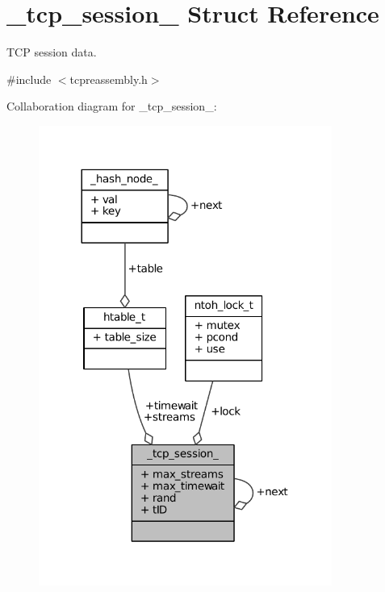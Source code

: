 \hypertarget{struct__tcp__session__}{\section{\-\_\-tcp\-\_\-session\-\_\- Struct Reference}
\label{struct__tcp__session__}
}


T\-C\-P session data.  




{\ttfamily \#include $<$tcpreassembly.\-h$>$}



Collaboration diagram for \-\_\-tcp\-\_\-session\-\_\-\-:
\nopagebreak
\begin{figure}[H]
\begin{center}
\leavevmode
\includegraphics[width=272pt]{struct__tcp__session____coll__graph}
\end{center}
\end{figure}
